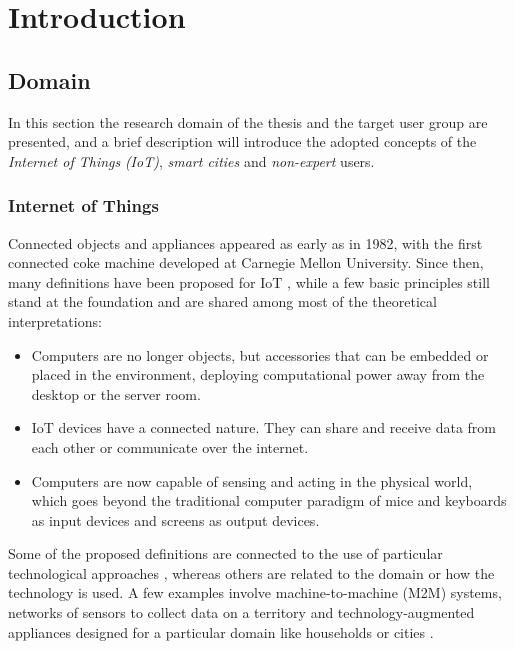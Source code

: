 \mainmatter

\chapter{Introduction}
\label{cha:introduction}

\section{Domain}
\label{sec:domain}

In this section the research domain of the thesis and the target user group are presented, and a brief description will introduce the adopted concepts of the \textit{Internet of Things} \textit{(IoT)}, \textit{smart cities} and \textit{non-expert} users.


\subsection{Internet of Things}
\label{sec:iot-domain}

Connected objects and appliances appeared as early as in 1982, with the first connected coke machine developed at Carnegie Mellon University. Since then, many definitions have been proposed for IoT \autocites{ashton_that_2009}{gubbi_internet_2013}, while a few basic principles still stand at the foundation and are shared among most of the theoretical interpretations:
\begin{itemize}
	\item Computers are no longer objects, but accessories that can be embedded or placed in the environment, deploying computational power away from the desktop or the server room.
	\item IoT devices have a connected nature. They can share and receive data from each other or communicate over the internet.
	\item Computers are now capable of sensing and acting in the physical world, which goes beyond the traditional computer paradigm of mice and keyboards as input devices and screens as output devices.
\end{itemize}

Some of the proposed definitions are connected to the use of particular technological approaches \autocite{welbourne_building_2009}, whereas others are related to the domain or how the technology is used. A few examples involve machine-to-machine (M2M) systems, networks of sensors to collect data on a territory \autocite{murty_citysense_2008} and technology-augmented appliances designed for a particular domain like households \autocite{alkar_internet_2005} or cities \autocite{hernandez-munoz_smart_2011}. 

